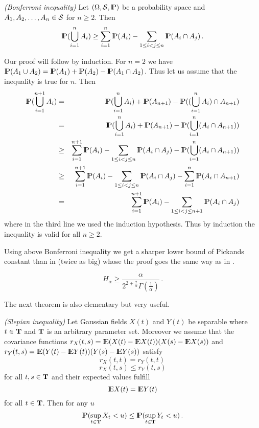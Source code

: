 \begin{lemma}\label{bonf}
{\em (Bonferroni inequality)}
Let $(\Omega, {\cal S}, {\rm I\hspace{-0.8mm}P})$ be a probability
space and \\
$A_1,A_2,\ldots,A_n\in {\cal S}$ for $n\geq 2$. Then
$$
{\rm I\hspace{-0.8mm}P}(\bigcup_{i=1}^n A_i)\geq \sum_{i=1}^n{\rm I\hspace{-0.8mm}P}(A_i)-
\sum_{1\leq i<j\leq n}{\rm I\hspace{-0.8mm}P}(A_i\cap A_j)\,.
$$
\end{lemma}
\proof
Our proof will follow by induction.
For $n=2$ we have ${\rm I\hspace{-0.8mm}P}(A_1\cup A_2)={\rm I\hspace{-0.8mm}P}(A_1)+{\rm I\hspace{-0.8mm}P}(A_2)-{\rm I\hspace{-0.8mm}P}(A_1\cap A_2)$.
Thus let us assume that the inequality is true for $n$. Then
\begin{eqnarray*}
\Prob(\bigcup_{i=1}^{n+1} A_i)&=& \Prob(\bigcup_{i=1}^n A_i)+\Prob(A_{n+1})
-\Prob((\bigcup_{i=1}^n A_i)\cap A_{n+1})\\
&=& \Prob(\bigcup_{i=1}^n A_i)+\Prob(A_{n+1})
-\Prob(\bigcup_{i=1}^n (A_i\cap A_{n+1}))\\
&\geq & \sum_{i=1}^{n+1}\Prob(A_i)-\sum_{1\leq i<j\leq n}\Prob(A_i\cap A_j)
-\Prob(\bigcup_{i=1}^n (A_i\cap A_{n+1}))\\
&\geq&\sum_{i=1}^{n+1}\Prob(A_i)-\sum_{1\leq i<j\leq n}\Prob(A_i\cap A_j)
-\sum_{i=1}^n\Prob(A_i\cap A_{n+1})\\
&=&\sum_{i=1}^{n+1}\Prob(A_i)-\sum_{1\leq i<j\leq n+1}\Prob(A_i\cap A_j)
\end{eqnarray*}
where in the third line we used the induction hypothesis. Thus by induction the inequality is
valid for all $n\geq 2$.
\halmos

Using above Bonferroni inequality we get a sharper lower bound of Pickands constant than in \cite{de:mi:ro:03} (twice as big) whose the proof goes the same way as in \cite{de:mi:ro:03}. 
\begin{theorem}
$$
H_\alpha\geq \frac{\alpha}{2^{2+\frac{2}{\alpha}}\Gamma\left(\frac{1}{\alpha}\right)}\,.
$$
\end{theorem}

The next theorem is also elementary but very useful.
\begin{theorem}
{\em (Slepian inequality)}
Let Gaussian fields $X(t)$ and $Y(t)$ be separable where $t\in {\bf T}$ and ${\bf T}$ is
an arbitrary parameter set. Moreover we assume that the covariance functions
$r_X(t,s)={\rm I\hspace{-0.8mm}E}(X(t)-{\rm I\hspace{-0.8mm}E} X(t))(X(s)-{\rm I\hspace{-0.8mm}E} X(s))$ and \\
$r_Y(t,s)={\rm I\hspace{-0.8mm}E}(Y(t)-{\rm I\hspace{-0.8mm}E} Y(t))(Y(s)-{\rm I\hspace{-0.8mm}E} Y(s))$
satisfy
$$
r_X(t,t)=r_Y(t,t)\,
$$
$$
r_X(t,s)\leq r_Y(t,s)
$$
for all $t,s\in {\bf T}$ and their expected values fulfill
$$
{\rm I\hspace{-0.8mm}E} X(t)={\rm I\hspace{-0.8mm}E} Y(t)
$$
for all $t\in {\bf T}$. Then for any $u$
$$
{\rm I\hspace{-0.8mm}P}(\sup_{t\in {\bf T}} X_t<u)\leq 
{\rm I\hspace{-0.8mm}P}(\sup_{t\in {\bf T}} Y_t<u)\,.
$$
\end{theorem}

